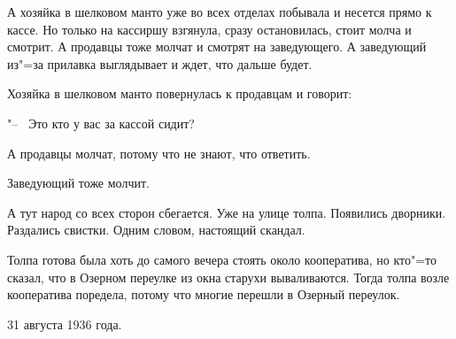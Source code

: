 А хозяйка в шелковом манто уже во всех отделах побывала и несется прямо к кассе. Но только на кассиршу взгянула, сразу остановилась, стоит молча и смотрит. А продавцы тоже молчат и смотрят на заведующего. А заведующий из"=за прилавка выглядывает и ждет, что дальше будет.
 
Хозяйка в шелковом манто повернулась к продавцам и говорит:

"--~ Это кто у вас за кассой сидит?
 
А продавцы молчат, потому что не знают, что ответить.
 
Заведующий тоже молчит.
 
А тут народ со всех сторон сбегается. Уже на улице толпа. Появились дворники. Раздались свистки. Одним словом, настоящий скандал.
 
Толпа готова была хоть до самого вечера стоять около кооператива, но кто"=то сказал, что в Озерном переулке из окна старухи вываливаются. Тогда толпа возле кооператива поредела, потому что многие перешли в Озерный переулок.

\begin{flushright}
    31 августа 1936 года.
\end{flushright}